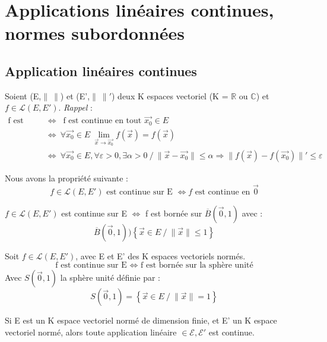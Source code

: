 \chapter{Applications linéaires continues, normes subordonnées}
\section{Application linéaires continues}
Soient (E,$\parallel~\parallel$) et (E',$\parallel~\parallel'$) deux K espaces vectoriel (K = $\mathbb{R}$ ou $\mathbb{C}$) et $f \in \mathcal{L}(E,E')$.
\textit{Rappel} : \\
\begin{align*}
\text{f est continue sur E} &\Leftrightarrow\ \text{ f est continue en tout }\overrightarrow{x_0} \in E \\
							&\Leftrightarrow\ \forall \overrightarrow{x_0} \in E~\lim_{\overrightarrow{x}\rightarrow \overrightarrow{x_0}} f(\overrightarrow{x}) = f(\overrightarrow{x}) \\
							&\Leftrightarrow\ \forall \overrightarrow{x_0} \in E, \forall \varepsilon > 0, \exists \alpha > 0~/~ \parallel \overrightarrow{x}-\overrightarrow{x_0} \parallel \leq \alpha \Rightarrow \parallel f(\overrightarrow{x})-f(\overrightarrow{x_0}) \parallel' \leq \varepsilon
\end{align*}
\begin{prop}
Nous avons la propriété suivante : 
$$f \in \mathcal{L}(E,E') \text{ est continue sur E } \Leftrightarrow f \text{ est continue en }\overrightarrow{0}$$
\end{prop}
\begin{prop}
$f\in \mathcal{L}(E,E')$ est continue sur E $\Leftrightarrow$ f est bornée sur $\overline{B}(\overrightarrow{0},1)$ avec :
$$\overline{B}(\overrightarrow{0},1) ) \left\lbrace \overrightarrow{x} \in E~ /~ \parallel \overrightarrow{x} \parallel \leq 1 \right\rbrace $$
\end{prop}
\begin{prop}
Soit $f\in \mathcal{L}(E,E')$, avec E et E' des K espaces vectoriels normés.
$$\text{ f est continue sur E }\Leftrightarrow \text{ f est bornée sur la sphère unité }$$
Avec $S(\overrightarrow{0},1)$ la sphère unité définie par :
$$S(\overrightarrow{0},1) = \left\lbrace \overrightarrow{x} \in E ~/~ \parallel \overrightarrow{x} \parallel = 1 \right\rbrace $$
\end{prop}
\begin{theo}
Si E est un K espace vectoriel normé de dimension finie, et E' un K espace vectoriel normé, alors toute application linéaire $\in \mathcal{E,E'}$ est continue.
\end{theo}
